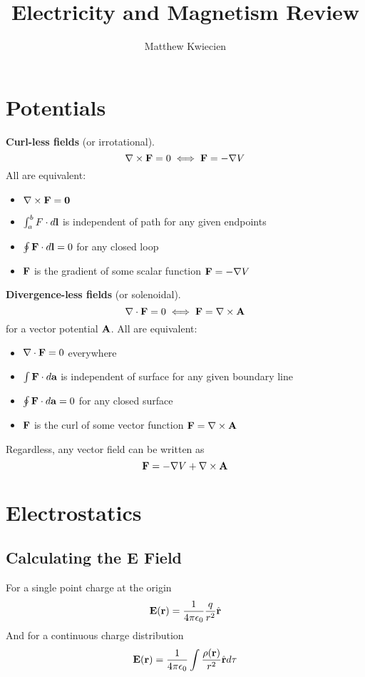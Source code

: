 \documentclass{article}
\title{Electricity and Magnetism Review}
\author{Matthew Kwiecien}
\newcommand{\vh}[1]{\hat{\vb{#1}}}
\newcommand{\ck}{\frac{1}{4\pi\epsilon_0}}
\begin{document}
\maketitle
\section{Potentials}

\textbf{Curl-less fields} (or irrotational). 
$$
\nabla \times \vb{F} = 0 \iff \vb{F} = -\nabla V
$$
All are equivalent:
\begin{itemize}
    \item $\nabla \times \vb{F} = \vb{0}$
    \item $\int_a^b F \cdot d\vb{l}$ is independent of path for any given endpoints
    \item $\oint \vb{F} \cdot d\vb{l} = 0$ for any closed loop
    \item $\vb{F}$ is the gradient of some scalar function $\vb{F} = -\nabla V$
\end{itemize}

\textbf{Divergence-less fields} (or solenoidal). 
$$
\nabla \cdot \vb{F} = 0 \iff \vb{F} = \nabla \times \vb{A}
$$
for a vector potential $\vb{A}$.  All are equivalent:
\begin{itemize}
    \item $\nabla \cdot \vb{F} = 0$ everywhere
    \item $\int \vb{F} \cdot d\vb{a}$ is independent of surface for any given boundary line
    \item $\oint \vb{F} \cdot d\vb{a} = 0$ for any closed surface
    \item $\vb{F} $ is the curl of some vector function $\vb{F} = \nabla \times \vb{A}$
\end{itemize}

Regardless, any vector field can be written as
$$
\vb{F} = -\nabla V + \nabla \times \vb{A}
$$

\section{Electrostatics}
\subsection{Calculating the E Field}
For a single point charge at the origin
$$
\vb{E}(\vb{r}) = \ck \frac{q}{r^2} \vh{r}
$$
And for a continuous charge distribution
$$
\vb{E}(\vb{r}) = \ck \int \frac{\rho(\vb{r})}{r^2} \vh{r} d\tau
$$
\end{document}
